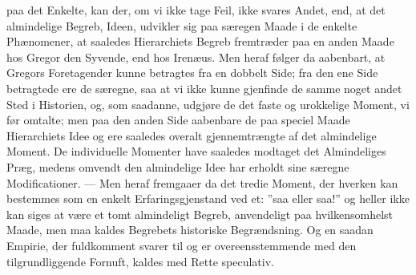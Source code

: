\documentclass[12pt]{book}
\newcommand{\opage}[1]{\marginnote{\footnotesize\textit{[#1]}}}
\begin{document}
paa det Enkelte, kan der, om vi ikke tage Feil, ikke svares Andet, end, at det
almindelige Begreb, Ideen, udvikler sig paa særegen Maade i de enkelte
Phænomener, at saaledes Hierarchiets Begreb fremtræder paa en anden Maade hos
Gregor den Syvende, end hos Irenæus. Men heraf følger da aabenbart, at Gregors
Foretagender kunne betragtes fra en dobbelt Side; fra den ene Side betragtede
ere de særegne, saa at vi ikke kunne gjenfinde de samme noget andet Sted i
Historien, og, som saadanne, udgjøre de det faste og urokkelige Moment, vi før
omtalte; men paa den anden Side aabenbare de paa speciel Maade Hierarchiets Idee
og ere saaledes overalt gjennemtrængte af det almindelige Moment. De individuelle
Momenter have saaledes modtaget det Almindeliges Præg, medens omvendt den
almindelige Idee har erholdt sine særegne Modificationer. --- Men heraf
fremgaaer da det tredie Moment, der hverken kan bestemmes som en enkelt
Erfaringsgjenstand ved et: ”saa eller saa!” og heller ikke%
%
\opage{25}%
kan siges at være et tomt almindeligt Begreb, anvendeligt paa
hvilkensomhelst Maade, men maa kaldes Begrebets historiske
Begrændsning. Og en saadan Empirie, der fuldkomment svarer til og er
overeensstemmende med den tilgrundliggende Fornuft, kaldes med Rette
speculativ.
\end{document}

